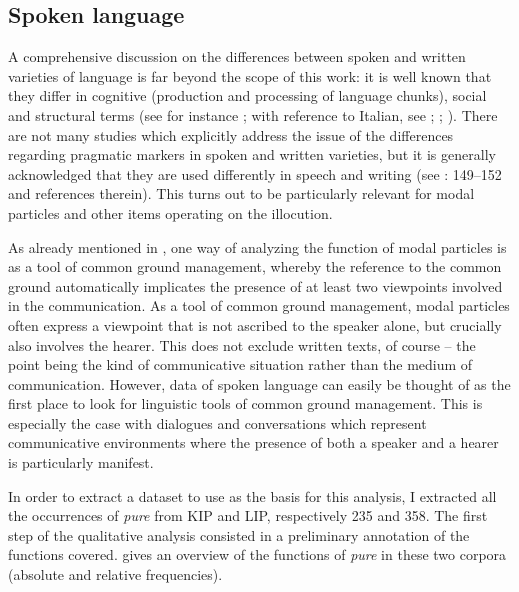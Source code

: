\subsection{Spoken language}
\hypertarget{Toc124860653}{}
A comprehensive discussion on the differences between spoken and written varieties of language is far beyond the scope of this work: it is well known that they differ in cognitive (production and processing of language chunks), social and structural terms (see for instance \citealt{ChafeTannen1987}; with reference to Italian, see \citealt{Berruto1985}; \citealt{Berretta1994}; \citealt{Pistolesi2016}). There are not many studies which explicitly address the issue of the differences regarding pragmatic markers in spoken and written varieties, but it is generally acknowledged that they are used differently in speech and writing (see \citealt{CribleCuenca2017}: 149–152 and references therein). This turns out to be particularly relevant for modal particles and other items operating on the illocution.

As already mentioned in , one way of analyzing the function of modal particles is as a tool of common ground management, whereby the reference to the common ground automatically implicates the presence of at least two viewpoints involved in the communication. As a tool of common ground management, modal particles often express a viewpoint that is not ascribed to the speaker alone, but crucially also involves the hearer. This does not exclude written texts, of course – the point being the kind of communicative situation rather than the medium of communication. However, data of spoken language can easily be thought of as the first place to look for linguistic tools of common ground management. This is especially the case with dialogues and conversations which represent communicative environments where the presence of both a speaker and a hearer is particularly manifest.

In order to extract a dataset to use as the basis for this analysis, I extracted all the occurrences of \textit{pure} from KIP and LIP, respectively 235 and 358. The first step of the qualitative analysis consisted in a preliminary annotation of the functions covered.   gives an overview of the functions of \textit{pure} in these two corpora (absolute and relative frequencies).


